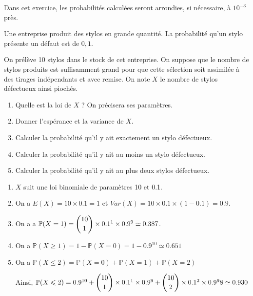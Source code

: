 \documentclass[11pt,fleqn, openany]{book} %
\begin{document}
\begin{exercise}[topic=prob12]Dans cet exercice, les probabilités calculées seront arrondies, si nécessaire, à $10^{-3}$ près.

Une entreprise produit des stylos en grande quantité. La probabilité qu'un stylo présente un défaut est de $0,1$.


On prélève 10 stylos dans le stock de cet entreprise. On suppose que le nombre de stylos produits est suffisamment grand pour que cette sélection soit assimilée à des tirages indépendants et avec remise. On note $X$ le nombre de stylos défectueux ainsi piochés.
\begin{enumerate}
\item Quelle est la loi de $X$ ? On précisera ses paramètres.
\item Donner l'espérance et la variance de $X$.
\item Calculer la probabilité qu'il y ait exactement un stylo défectueux.
\item Calculer la probabilité qu'il y ait au moins un stylo défectueux.
\item Calculer la probabilité qu'il y ait au plus deux stylos défectueux.
\end{enumerate}\newpage \end{exercise}

\begin{solution}\hspace{0pt}
\begin{enumerate}
\item $X$ suit une loi binomiale de paramètres 10 et 0.1.
\item On a $E(X)=10 \times 0.1 = 1$ et $Var(X)=10 \times 0.1 \times (1-0.1)=0.9$.
\item On a a $\mathbb{P}(X=1)=\dbinom{10}{1} \times 0.1^1 \times 0.9 ^9 \simeq 0.387$.
\item On a $\mathbb{P}(X \geqslant 1)=1-\mathbb{P}(X=0)=1-0.9^{10}\simeq 0.651$
\item  On a $\mathbb{P}(X\leqslant 2)=\mathbb{P}(X=0) + \mathbb{P}(X=1) + \mathbb{P}(X=2)$

Ainsi, $\mathbb{P}(X\leqslant 2) = 0.9^{10}+\dbinom{10}{1} \times 0.1^1 \times 0.9 ^9  + \dbinom{10}{2} \times 0.1^2 \times 0.9 ^98 \simeq 0.930$
\end{enumerate}\end{solution}
\end{document}
